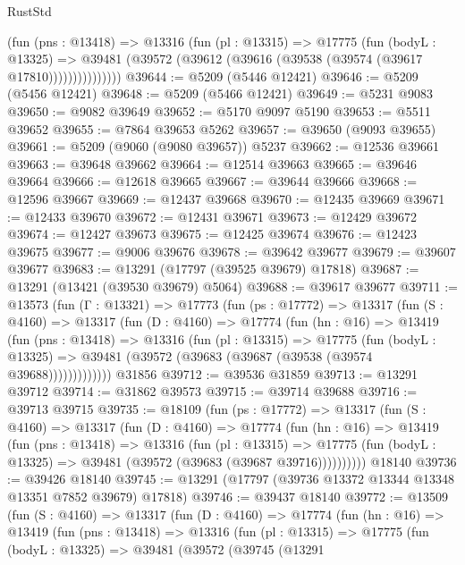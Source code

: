 \begin{lexlean}{RustStd}
\begin{coremodule}
                (fun (pns : @13418) =>
                @13316
                  (fun (pl : @13315) =>
                  @17775
                    (fun (bodyL : @13325) =>
                    @39481 (@39572 (@39612 (@39616 (@39538 (@39574 (@39617 @17810)))))))))))))))
@39644 := @5209 (@5446 @12421)
@39646 := @5209 (@5456 @12421)
@39648 := @5209 (@5466 @12421)
@39649 := @5231 @9083
@39650 := @9082 @39649
@39652 := @5170 @9097 @5190
@39653 := @5511 @39652
@39655 := @7864 @39653 @5262
@39657 := @39650 (@9093 @39655)
@39661 := @5209 (@9060 (@9080 @39657)) @5237
@39662 := @12536 @39661
@39663 := @39648 @39662
@39664 := @12514 @39663
@39665 := @39646 @39664
@39666 := @12618 @39665
@39667 := @39644 @39666
@39668 := @12596 @39667
@39669 := @12437 @39668
@39670 := @12435 @39669
@39671 := @12433 @39670
@39672 := @12431 @39671
@39673 := @12429 @39672
@39674 := @12427 @39673
@39675 := @12425 @39674
@39676 := @12423 @39675
@39677 := @9006 @39676
@39678 := @39642 @39677
@39679 := @39607 @39677
@39683 := @13291 (@17797 (@39525 @39679) @17818)
@39687 := @13291 (@13421 (@39530 @39679) @5064)
@39688 := @39617 @39677
@39711 := @13573
    (fun (Γ : @13321) =>
    @17773
      (fun (ps : @17772) =>
      @13317
        (fun (S : @4160) =>
        @13317
          (fun (D : @4160) =>
          @17774
            (fun (hn : @16) =>
            @13419
              (fun (pns : @13418) =>
              @13316
                (fun (pl : @13315) =>
                @17775
                  (fun (bodyL : @13325) =>
                  @39481 (@39572 (@39683 (@39687 (@39538 (@39574 @39688)))))))))))))
    @31856
@39712 := @39536 @31859
@39713 := @13291 @39712
@39714 := @31862 @39573
@39715 := @39714 @39688
@39716 := @39713 @39715
@39735 := @18109
    (fun (ps : @17772) =>
    @13317
      (fun (S : @4160) =>
      @13317
        (fun (D : @4160) =>
        @17774
          (fun (hn : @16) =>
          @13419
            (fun (pns : @13418) =>
            @13316
              (fun (pl : @13315) =>
              @17775 (fun (bodyL : @13325) => @39481 (@39572 (@39683 (@39687 @39716))))))))))
    @18140
@39736 := @39426 @18140
@39745 := @13291 (@17797 (@39736 @13372 @13344 @13348 @13351 @7852 @39679) @17818)
@39746 := @39437 @18140
@39772 := @13509
    (fun (S : @4160) =>
    @13317
      (fun (D : @4160) =>
      @17774
        (fun (hn : @16) =>
        @13419
          (fun (pns : @13418) =>
          @13316
            (fun (pl : @13315) =>
            @17775
              (fun (bodyL : @13325) =>
              @39481
                (@39572
                  (@39745
                    (@13291

\end{coremodule}
\end{lexlean}
